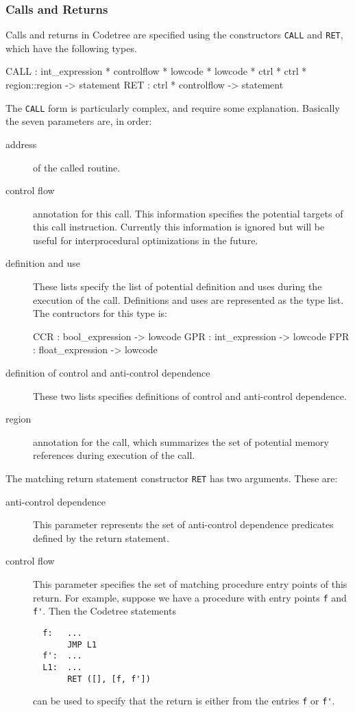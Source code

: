 \subsubsection{Calls and Returns}

Calls and returns in Codetree are specified using the constructors
\verb|CALL| and \verb|RET|, which have the following types.
\begin{SML}
   CALL : int_expression * controlflow * lowcode * lowcode * 
          ctrl * ctrl * region::region -> statement
   RET  : ctrl * controlflow -> statement
\end{SML}

The \verb|CALL| form is particularly complex, and require some explanation.
Basically the seven parameters are, in order:
\begin{description}
   \item[address] of the called routine.
   \item[control flow] annotation for this call.  This information 
specifies the potential targets of this call instruction.  Currently
this information is ignored but will be useful for interprocedural   
optimizations in the future.
   \item[definition and use]  These lists specify the list of
potential definition and uses during the execution of the call.
Definitions and uses are represented as the type  list.
The contructors for this type is:
\begin{SML}
  CCR : bool_expression -> lowcode
  GPR : int_expression -> lowcode
  FPR : float_expression -> lowcode
\end{SML}
   \item[definition of control and anti-control dependence] 
These two lists specifies definitions of control and anti-control dependence.
   \item[region] annotation for the call, which summarizes
the set of potential memory references during execution of the call.
\end{description}

The matching return statement constructor \verb|RET| has two
arguments.  These are:
\begin{description}
  \item[anti-control dependence]  This parameter represents
the set of anti-control dependence predicates defined by the return
statement.
  \item[control flow]  This parameter specifies the set of matching
procedure entry points of this return.  For example, suppose we have
a procedure with entry points \verb|f| and \verb|f'|.  
Then the Codetree statements 
\begin{verbatim}
  f:   ...
       JMP L1
  f':  ...
  L1:  ...
       RET ([], [f, f'])
\end{verbatim}
\noindent can be used to specify that the return is either from
the entries \verb|f| or \verb|f'|.  
\end{description}

